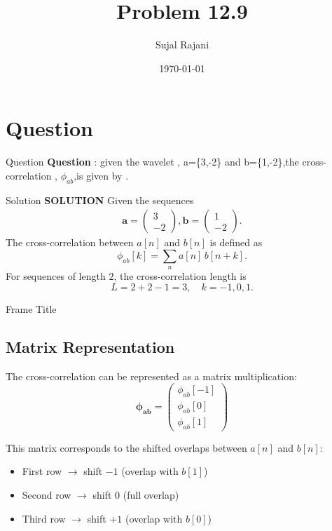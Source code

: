 \documentclass{beamer}
\title{Problem 12.9}
\author{Sujal Rajani}
\date{\today}
\let\vec\mathbf
\theoremstyle{remark}
\newcommand{\myvec}[1]{\ensuremath{\begin{pmatrix}#1\end{pmatrix}}}
\numberwithin{equation}{section}
\begin{document}
\begin{frame}
\titlepage
\end{frame}

\section{Question}
\begin{frame}{Question}
\textbf{Question }:
given the wavelet , a=\{3,-2\} and b=\{1,-2\},the cross-correlation , $\phi_{ab}$,is given by .
\end{frame}
\begin{frame}{Solution}
\textbf{SOLUTION}
Given the sequences
\begin{align*}
\vec{a} = \myvec{3\\-2}, \vec{ b} = \myvec{1\\-2}.
\end{align*}
The cross-correlation between $a[n]$ and $b[n]$ is defined as
\[
\phi_{ab}[k] = \sum_{n} a[n]\, b[n+k].
\]
For sequences of length $2$, the cross-correlation length is
\[
L = 2+2-1 = 3, \quad k = -1, 0, 1.
\]
     \end{frame}
     \begin{frame}{Frame Title}
       \subsection*{Matrix Representation}

The cross-correlation can be represented as a matrix multiplication:
\[
\boldsymbol{{\phi}_{ab}}=
\myvec{
\phi_{ab}[-1] \\[0.4em]
\phi_{ab}[0] \\[0.4em]
\phi_{ab}[1]
}
\]

\noindent
This matrix corresponds to the shifted overlaps between $a[n]$ and $b[n]$:

\begin{itemize}
    \item First row $\rightarrow$ shift $-1$ (overlap with $b[1]$)
    \item Second row $\rightarrow$ shift $0$ (full overlap)
    \item Third row $\rightarrow$ shift $+1$ (overlap with $b[0]$)
\end{itemize}

     \end{frame}
\end{document}
